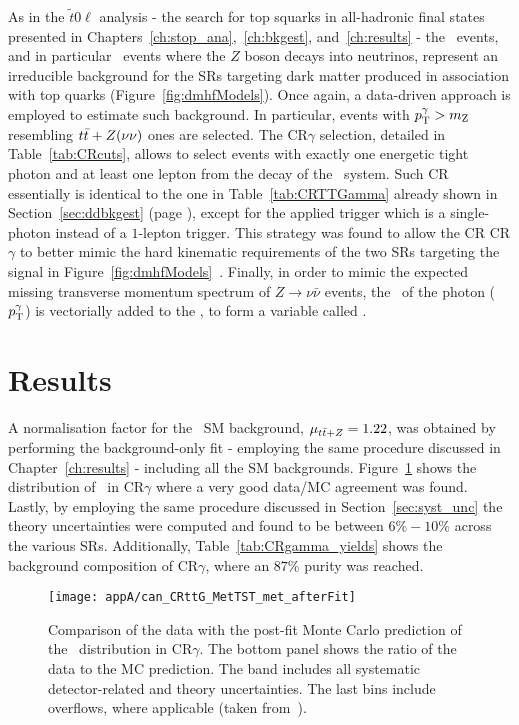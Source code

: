 		As in the $\tilde{t}0\ell$ analysis - the search for top squarks in all-hadronic final states presented in Chapters~\ref{ch:stop_ana},~\ref{ch:bkgest}, and~\ref{ch:results} - the \ttV\ events, and in particular \ttZ\ events where the $Z$ boson decays into neutrinos, represent an irreducible background for the \acp{SR} targeting dark matter produced in association with top quarks (Figure~\ref{fig:dmhfModels}). Once again, a data-driven approach is employed to estimate such background. In particular, events with $p_{\mathrm{T}}^{\gamma} > m_{\mathrm Z}$ resembling $t\bar{t}+Z(\nu\nu)$ ones are selected. The CR${\gamma}$ selection, detailed in Table~\ref{tab:CRcuts}, allows to select events with exactly one energetic tight photon and at least one lepton from the decay of the \ttbar\ system. Such \ac{CR} essentially is identical to the one in Table~\ref{tab:CRTTGamma} already shown in Section~\ref{sec:ddbkgest} (page \pageref{sec:ddbkgest}), except for the applied trigger which is a single-photon instead of a $1$-lepton trigger. This strategy was found to allow the \ac{CR} CR$\gamma$ to better mimic the hard kinematic requirements of the two \acp{SR} targeting the signal in Figure~\ref{fig:dmhfModels}~\cite{DMhf}. Finally, in order to mimic the expected missing transverse momentum spectrum of $Z\rightarrow\nu\bar{\nu}$ events, the \pt\ of the photon ($p_{\mathrm{T}}^{\gamma}$) is vectorially added to the \ptmiss, to form a variable called \metprimeg.



	\section{Results}

		A normalisation factor for the \ttZ\ \ac{SM} background, $\mu_{t\bar{t}+Z} = 1.22$, was obtained by performing the background-only fit - employing the same procedure discussed in Chapter~\ref{ch:results} - including all the \ac{SM} backgrounds. Figure~\ref{fig:metprimecrgamma} shows the distribution of \metprimeg\ in CR$\gamma$ where a very good data/MC agreement was found. Lastly, by employing the same procedure discussed in Section~\ref{sec:syst_unc} the theory uncertainties were computed and found to be between $6\%-10\%$ across the various \acp{SR}. Additionally, Table~\ref{tab:CRgamma_yields} shows the background composition of CR$\gamma$, where an $87\%$ purity was reached.

		\begin{figure}[!htb]
		\centering
			\texttt{[image: appA/can\_CRttG\_MetTST\_met\_afterFit]}
			\caption{Comparison of the data with the post-fit Monte Carlo prediction of the \metprimeg\ distribution in CR$\gamma$. The bottom panel shows the ratio of the data to the \ac{MC} prediction. The band includes all systematic
			detector-related and theory uncertainties. The last bins include overflows, where applicable (taken from~\cite{DMhf}).}
			\label{fig:metprimecrgamma}
		\end{figure}

